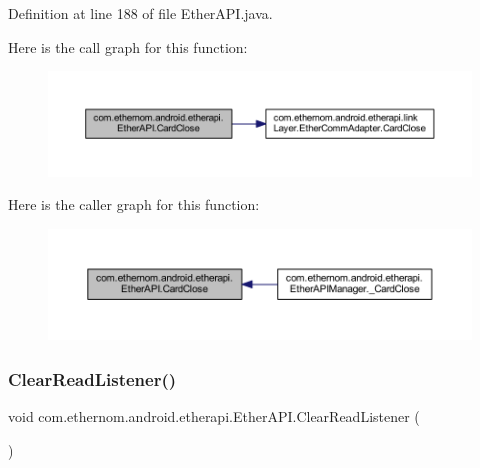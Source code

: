 Definition at line 188 of file Ether\+A\+P\+I.\+java.

Here is the call graph for this function\+:\nopagebreak
\begin{figure}[H]
\begin{center}
\leavevmode
\includegraphics[width=350pt]{classcom_1_1ethernom_1_1android_1_1etherapi_1_1_ether_a_p_i_a75a0f23761ba90a058d2df1151e06d2b_cgraph}
\end{center}
\end{figure}
Here is the caller graph for this function\+:\nopagebreak
\begin{figure}[H]
\begin{center}
\leavevmode
\includegraphics[width=350pt]{classcom_1_1ethernom_1_1android_1_1etherapi_1_1_ether_a_p_i_a75a0f23761ba90a058d2df1151e06d2b_icgraph}
\end{center}
\end{figure}
\mbox{\label{classcom_1_1ethernom_1_1android_1_1etherapi_1_1_ether_a_p_i_a8586a32236afdebca0f9730412d9e000}} 
\subsubsection{\texorpdfstring{Clear\+Read\+Listener()}{ClearReadListener()}}
{\footnotesize\ttfamily void com.\+ethernom.\+android.\+etherapi.\+Ether\+A\+P\+I.\+Clear\+Read\+Listener (\begin{DoxyParamCaption}{ }\end{DoxyParamCaption})}




